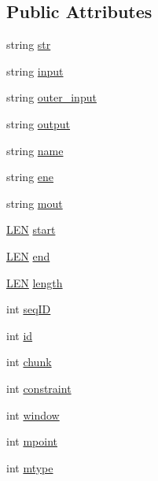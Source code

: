 \subsection*{Public Attributes}
\begin{DoxyCompactItemize}
\item 
string \hyperlink{class_rfold_1_1_arg_a10258eb45eb764844e49e5587e187af7}{str}
\item 
string \hyperlink{class_rfold_1_1_arg_a9844cbade756ff05f5c9592f17a63d95}{input}
\item 
string \hyperlink{class_rfold_1_1_arg_ae62e02353945f6073c46c27c7f583649}{outer\+\_\+input}
\item 
string \hyperlink{class_rfold_1_1_arg_a172c943d9eafc1bfc27fde48db831f5d}{output}
\item 
string \hyperlink{class_rfold_1_1_arg_a38ab74cced49339e67fe8f70bb6827fb}{name}
\item 
string \hyperlink{class_rfold_1_1_arg_a3fc1f86f5f3f7b2572392b547a2ef6a9}{ene}
\item 
string \hyperlink{class_rfold_1_1_arg_ad397909fcb25763feae093230be4358b}{mout}
\item 
\hyperlink{energy__const_8hh_a05b49c662c073f89e86804f7856622a0}{L\+E\+N} \hyperlink{class_rfold_1_1_arg_afe6c58f953e12b4964a7c14b78ee731e}{start}
\item 
\hyperlink{energy__const_8hh_a05b49c662c073f89e86804f7856622a0}{L\+E\+N} \hyperlink{class_rfold_1_1_arg_ad5641c6dff38e98a3dadb60223a4b630}{end}
\item 
\hyperlink{energy__const_8hh_a05b49c662c073f89e86804f7856622a0}{L\+E\+N} \hyperlink{class_rfold_1_1_arg_ae5c8053e399657b0c83bd10a904ac354}{length}
\item 
int \hyperlink{class_rfold_1_1_arg_a7e5e99f9fa61d2b7fe2d03d212f075d3}{seq\+I\+D}
\item 
int \hyperlink{class_rfold_1_1_arg_a49ec979ca116afb70aa7a25bff04d3a8}{id}
\item 
int \hyperlink{class_rfold_1_1_arg_a08a4793c210b819471f4541cc24f8859}{chunk}
\item 
int \hyperlink{class_rfold_1_1_arg_ab05512b7f96ce930ac13b873e7c298b1}{constraint}
\item 
int \hyperlink{class_rfold_1_1_arg_abf6954c2deff613f191b1fae248389f3}{window}
\item 
int \hyperlink{class_rfold_1_1_arg_a273269902f8a9b9974c1d46800df16e9}{mpoint}
\item 
int \hyperlink{class_rfold_1_1_arg_a9736867f9aac222c47efa0b5218fc8fa}{mtype}

\end{DoxyCompactItemize}
